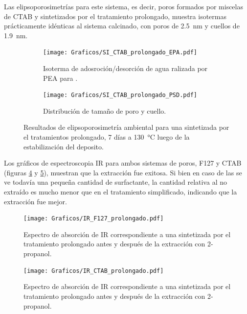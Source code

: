 {		Las elipsoporosimetrías para este sistema, es decir, poros formados por miscelas de CTAB y sintetizados por el tratamiento prolongado, muestra isotermas prácticamente idénticas al sistema calcinado, con poros de \SI{2,5}{nm} y cuellos de \SI{1,9}{nm}.
			     
		 \begin{figure}[!ht]
		  	\begin{subfigure}[t]{0.495\textwidth}
		  	\texttt{[image: Graficos/SI\_CTAB\_prolongado\_EPA.pdf]}
			\caption{Isoterma de adosroción/desorción de agua ralizada por PEA para \pdmC\space.}
			\label{fig:CTAB_prolongado_EPA}
			\end{subfigure}
			\begin{subfigure}[t]{0.495\textwidth}
		  	\texttt{[image: Graficos/SI\_CTAB\_prolongado\_PSD.pdf]}
			\caption{Distribución de tamaño de poro y cuello.\\ }
			\label{fig:CTAB_prolongado_PSD}
			\end{subfigure}
			\caption[Elipsoporosimetría \pdmC\space tratamiento prolongado.]{Resultados de elipsoporosimetría ambiental para una \pdmC\space sintetizada por el tratamientos prolongado, 7 días a \SI{130}{\celsius} luego de la estabilización del deposito.}
			\end{figure}

		Los gráficos de espectroscopia IR para ambos sistemas de poros, F127 y CTAB (figuras \ref{fig:IR_F127_prolongado} y \ref{fig:IR_CTAB_prolongado}),  muestran que la extracción fue exitosa. Si bien en caso de las \pdmC\space se ve todavía una pequeña cantidad de surfactante, la cantidad relativa al no extraído es mucho menor que en el tratamiento simplificado, indicando que la extracción fue mejor. %
		
		\begin{figure}[!ht]
			\begin{center}
			\texttt{[image: Graficos/IR\_F127\_prolongado.pdf]}
			\caption[FTIR \pdmF\space tratamiento prolongado.]{Espectro de absorción de IR correspondiente a una \pdmF\space sintetizada por el tratamiento prolongado antes y después de la extracción con 2-propanol.}
			\label{fig:IR_F127_prolongado}
			\end{center}
			\end{figure}
		
		\begin{figure}[!ht]
			\begin{center}
			\texttt{[image: Graficos/IR\_CTAB\_prolongado.pdf]}
			\caption[FTIR \pdmC\space tratamiento prolongado.]{Espectro de absorción de IR correspondiente a una \pdmC\space sintetizada por el tratamiento prolongado antes y después de la extracción con 2-propanol.}
			\label{fig:IR_CTAB_prolongado}
			\end{center}
			\end{figure}	

}
